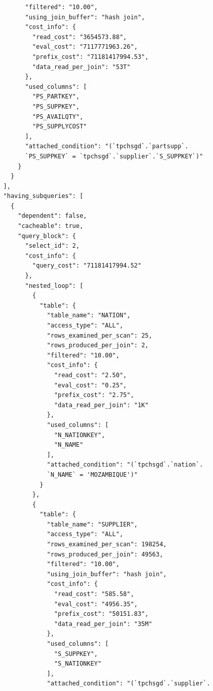 \documentclass{article}
\begin{document}
\begin{lstlisting}
                "filtered": "10.00",
                "using_join_buffer": "hash join",
                "cost_info": {
                  "read_cost": "3654573.88",
                  "eval_cost": "7117771963.26",
                  "prefix_cost": "71181417994.53",
                  "data_read_per_join": "53T"
                },
                "used_columns": [
                  "PS_PARTKEY",
                  "PS_SUPPKEY",
                  "PS_AVAILQTY",
                  "PS_SUPPLYCOST"
                ],
                "attached_condition": "(`tpchsgd`.`partsupp`.
                `PS_SUPPKEY` = `tpchsgd`.`supplier`.`S_SUPPKEY`)"
              }
            }
          ],
          "having_subqueries": [
            {
              "dependent": false,
              "cacheable": true,
              "query_block": {
                "select_id": 2,
                "cost_info": {
                  "query_cost": "71181417994.52"
                },
                "nested_loop": [
                  {
                    "table": {
                      "table_name": "NATION",
                      "access_type": "ALL",
                      "rows_examined_per_scan": 25,
                      "rows_produced_per_join": 2,
                      "filtered": "10.00",
                      "cost_info": {
                        "read_cost": "2.50",
                        "eval_cost": "0.25",
                        "prefix_cost": "2.75",
                        "data_read_per_join": "1K"
                      },
                      "used_columns": [
                        "N_NATIONKEY",
                        "N_NAME"
                      ],
                      "attached_condition": "(`tpchsgd`.`nation`.
                      `N_NAME` = 'MOZAMBIQUE')"
                    }
                  },
                  {
                    "table": {
                      "table_name": "SUPPLIER",
                      "access_type": "ALL",
                      "rows_examined_per_scan": 198254,
                      "rows_produced_per_join": 49563,
                      "filtered": "10.00",
                      "using_join_buffer": "hash join",
                      "cost_info": {
                        "read_cost": "585.58",
                        "eval_cost": "4956.35",
                        "prefix_cost": "50151.83",
                        "data_read_per_join": "35M"
                      },
                      "used_columns": [
                        "S_SUPPKEY",
                        "S_NATIONKEY"
                      ],
                      "attached_condition": "(`tpchsgd`.`supplier`.

\end{lstlisting}
\end{document}
